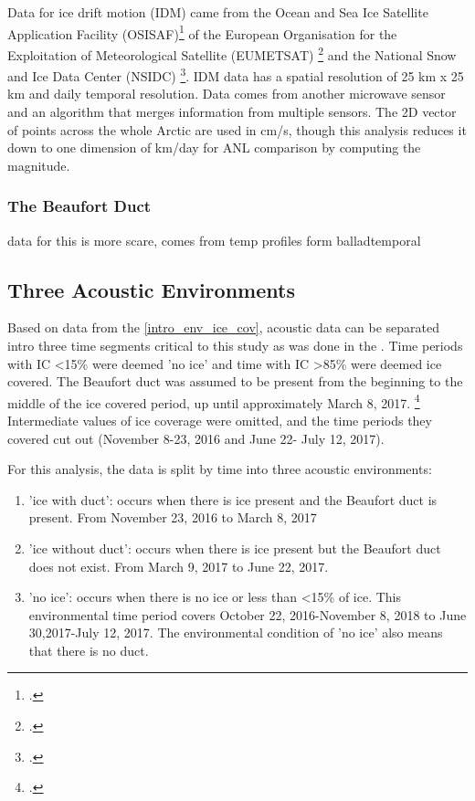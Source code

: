Data for ice drift motion (IDM) came from the Ocean and Sea Ice Satellite Application Facility (OSISAF)\footcite[]{osisaf_data} of the European Organisation for the Exploitation of Meteorological Satellite (EUMETSAT) \footcite[]{osisaf_man} and the National Snow and Ice Data Center (NSIDC) \footcite[]{Tschudi2019polar}. IDM data has a spatial resolution of 25 km x 25 km and daily temporal resolution. Data comes from another microwave sensor and an algorithm that merges information from multiple sensors. The 2D vector of points across the whole Arctic are used in cm/s, though this analysis reduces it down to one dimension of km/day for ANL comparison by computing the magnitude.

\subsubsection{The Beaufort Duct}
data for this is more scare, comes from temp profiles form balladtemporal

\subsection{Three Acoustic Environments} \label{intro_env_split}

Based on data from the \autoref{intro_env_ice_cov}, acoustic data can be separated intro three time segments critical to this study as was done in the \cite{bonnel2021}. Time periods with IC <15\% were deemed 'no ice' and time with IC >85\% were deemed ice covered. The Beaufort duct was assumed to be present from the beginning to the middle of the ice covered period, up until approximately March 8, 2017. \footcite[]{ballard2020temporal} Intermediate values of ice coverage were omitted, and the time periods they covered cut out (November 8-23, 2016 and June 22- July 12, 2017).

For this analysis, the data is split by time into three acoustic environments:
\begin{enumerate}
    \item{'ice with duct': occurs when there is ice present and the Beaufort duct is present. From November 23, 2016 to March 8, 2017}
    \item{'ice without duct': occurs when there is ice present but the Beaufort duct does not exist. From March 9, 2017 to June 22, 2017.    }
    \item{'no ice': occurs when there is no ice or less than <15\% of ice. This environmental time period covers October 22, 2016-November 8, 2018 to June 30,2017-July 12, 2017. The environmental condition of 'no ice' also means that there is no duct.}
\end{enumerate}

